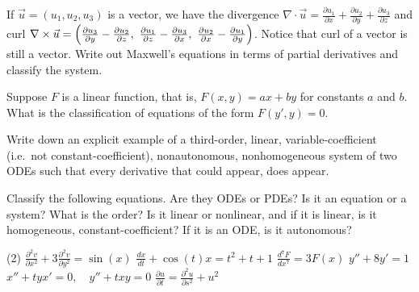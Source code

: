 \begin{exercise}
If $\vec{u} = (u_1,u_2,u_3)$ is a vector, we have the divergence
$\nabla \cdot \vec{u} =
\frac{\partial u_1}{\partial x} +
\frac{\partial u_2}{\partial y} +
\frac{\partial u_3}{\partial z}$ and curl
$\nabla \times \vec{u} =
\Bigl(
\frac{\partial u_3}{\partial y} - \frac{\partial u_2}{\partial z} , ~
\frac{\partial u_1}{\partial z} - \frac{\partial u_3}{\partial x} , ~
\frac{\partial u_2}{\partial x} - \frac{\partial u_1}{\partial y} \Bigr)$.
Notice that curl of a vector is still a vector.  Write out Maxwell's
equations in terms of partial derivatives and classify the system.
\end{exercise}

\begin{exercise}
Suppose $F$ is a linear function, that is,
$F(x,y) = ax+by$ for constants $a$ and $b$.  What is the
classification of equations of the form $F(y',y) = 0$.
\end{exercise}

\begin{exercise}
Write down an explicit example of a third-order, linear,
variable-coefficient (i.e.\ not constant-coefficient),
nonautonomous, nonhomogeneous system of two ODEs such that every derivative
that could appear, does appear.
\end{exercise}

\setcounter{exercise}{100}

\begin{exercise}
Classify the following equations.  Are they ODEs or PDEs?  Is it an equation
or a system?  What is the order?  Is it linear or nonlinear, and if it is
linear, is it homogeneous, constant-coefficient?  If it is an ODE\@, is it
autonomous?
\begin{tasks}(2)
\task $\displaystyle \frac{\partial^2 v}{\partial x^2} + 3 \frac{\partial^2
v}{\partial y^2} = \sin(x)$
\task $\displaystyle \frac{d x}{dt} + \cos(t) x = t^2+t+1$
\task $\displaystyle \frac{d^7 F}{dx^7} = 3F(x)$
\task $\displaystyle y''+8y'=1$
\task $\displaystyle x''+tyx'=0, \quad y''+txy = 0$
\task $\displaystyle \frac{\partial u}{\partial t} = \frac{\partial^2 u}{\partial s^2} + u^2$
\end{tasks}
\end{exercise}

